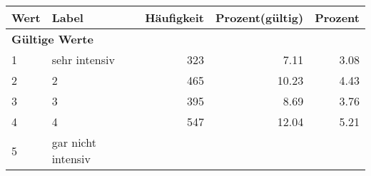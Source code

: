      \begin{longtable}{lXrrr}
     \toprule
     \textbf{Wert} & \textbf{Label} & \textbf{Häufigkeit} & \textbf{Prozent(gültig)} & \textbf{Prozent} \\
     \endhead
     \midrule
     \multicolumn{5}{l}{\textbf{Gültige Werte}}\\

     1 &
     \multicolumn{1}{X}{ sehr intensiv   } &


       \num{323} &
       \num[round-mode=places,round-precision=2]{7,11} &
         \num[round-mode=places,round-precision=2]{3,08} \\

     2 &
     \multicolumn{1}{X}{ 2   } &


       \num{465} &
       \num[round-mode=places,round-precision=2]{10,23} &
         \num[round-mode=places,round-precision=2]{4,43} \\

     3 &
     \multicolumn{1}{X}{ 3   } &


       \num{395} &
       \num[round-mode=places,round-precision=2]{8,69} &
         \num[round-mode=places,round-precision=2]{3,76} \\

     4 &
     \multicolumn{1}{X}{ 4   } &


       \num{547} &
       \num[round-mode=places,round-precision=2]{12,04} &
         \num[round-mode=places,round-precision=2]{5,21} \\

     5 &
     \multicolumn{1}{X}{ gar nicht intensiv   } &



\end{longtable}
